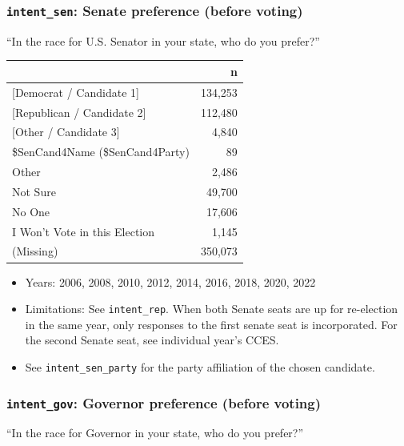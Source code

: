 \documentclass[10pt,article,oneside]{memoir}
\theoremstyle{definition}
\begin{document}
\subsubsection{\texorpdfstring{\texttt{intent\_sen}: Senate preference
(before
voting)}{intent\_sen: Senate preference (before voting)}}\label{intent_sen-senate-preference-before-voting}

``In the race for U.S. Senator in your state, who do you prefer?''

\begin{table}[H]
\centering
\begin{tabular}[t]{lr}
\toprule
 & n\\
\midrule
{}{[Democrat / Candidate 1]} & 134,253\\
{}{[Republican / Candidate 2]} & 112,480\\
{}{[Other / Candidate 3]} & 4,840\\
\$SenCand4Name (\$SenCand4Party) & 89\\
Other & 2,486\\
Not Sure & 49,700\\
No One & 17,606\\
I Won't Vote in this Election & 1,145\\
(Missing) & 350,073\\
\bottomrule
\end{tabular}
\end{table}

\begin{itemize}
\tightlist
\item
  Years: 2006, 2008, 2010, 2012, 2014, 2016, 2018, 2020, 2022
\item
  Limitations: See \texttt{intent\_rep}. When both Senate seats are up
  for re-election in the same year, only responses to the first senate
  seat is incorporated. For the second Senate seat, see individual
  year's CCES.
\item
  See \texttt{intent\_sen\_party} for the party affiliation of the
  chosen candidate.
\end{itemize}

\subsubsection{\texorpdfstring{\texttt{intent\_gov}: Governor preference
(before
voting)}{intent\_gov: Governor preference (before voting)}}\label{intent_gov-governor-preference-before-voting}

``In the race for Governor in your state, who do you prefer?''
\end{document}
